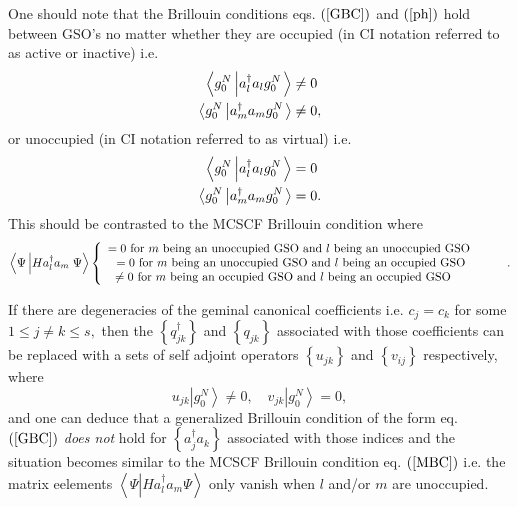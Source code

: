 \documentclass{preprint}
\begin{document}
One should note that the Brillouin conditions eqs. $\left( \ref{GBC}\right) $
and $\left( \ref{ph}\right) $ hold between GSO's no matter whether they are
occupied (in CI notation referred to as active or inactive) i.e.
\begin{align}
\left\langle g_{0}^{N}\left\vert a_{l}^{\dagger}a_{l}g_{0}^{N}\right.
\right\rangle & \neq0  \notag \\
\left\langle g_{0}^{N}\left\vert a_{m}^{\dagger}a_{m}g_{0}^{N}\right.
\right\rangle & \neq0,
\end{align}
or unoccupied (in CI notation referred to as virtual) i.e.
\begin{align}
\left\langle g_{0}^{N}\left\vert a_{l}^{\dagger}a_{l}g_{0}^{N}\right.
\right\rangle & =0  \notag \\
\left\langle g_{0}^{N}\left\vert a_{m}^{\dagger}a_{m}g_{0}^{N}\right.
\right\rangle & =0.
\end{align}
This should be contrasted to the MCSCF Brillouin condition where
\begin{equation}
\left\langle \Psi\left\vert Ha_{l}^{\dagger}a_{m}\right. \Psi\right\rangle
\left\{
\begin{array}{c}
=0\text{ for }m\text{ being an unoccupied GSO and }l\text{ being an
unoccupied GSO \quad\quad} \\
=0\text{ for }m\text{ being an unoccupied GSO and }l\text{ being an occupied
GSO\quad\quad} \\
\neq0\text{ for }m\text{ being an occupied GSO and }l\text{ being an
occupied GSO\quad\quad\quad\ }%
\end{array}
\right. .  \label{MBC}
\end{equation}

If there are degeneracies of the geminal canonical coefficients i.e. $%
c_{j}=c_{k}$ for some $1\leq j\neq k\leq s,$ then the $\left\{
q_{jk}^{\dagger}\right\} $ and $\left\{ q_{jk}\right\} $ associated with
those coefficients can be replaced \cite{Goscinski82a} with a sets of self
adjoint operators $\left\{ u_{jk}\right\} $ and $\left\{ v_{ij}\right\} $
respectively, where
\begin{equation}
u_{jk}\left\vert g_{0}^{N}\right\rangle \neq0,\quad v_{jk}\left\vert
g_{0}^{N}\right\rangle =0,
\end{equation}
and one can deduce that a generalized Brillouin condition of the form eq. $%
\left( \ref{GBC}\right) $ \emph{does not} hold for $\left\{
a_{j}^{\dagger}a_{k}\right\} $ associated with those indices and the
situation becomes similar to the MCSCF Brillouin condition eq. $\left( \ref%
{MBC}\right) $ i.e. the matrix eelements $\left\langle \Psi\left\vert
Ha_{l}^{\dagger}a_{m}\right. \Psi\right\rangle $ only vanish when $l$ and/or
$m$ are unoccupied.
\end{document}
